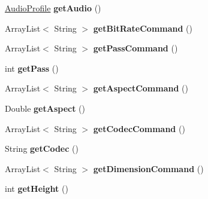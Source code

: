 \begin{DoxyCompactItemize}
\item 
\hypertarget{classvideo_1_1_video_profile_a46c05dc58b177b83356823f6cac11aaf}{
\hyperlink{classvideo_1_1_audio_profile}{AudioProfile} {\bfseries getAudio} ()}
\label{classvideo_1_1_video_profile_a46c05dc58b177b83356823f6cac11aaf}

\item 
\hypertarget{classvideo_1_1_video_profile_a53754b5c05e875826f8929217d2b11c7}{
ArrayList$<$ String $>$ {\bfseries getBitRateCommand} ()}
\label{classvideo_1_1_video_profile_a53754b5c05e875826f8929217d2b11c7}

\item 
\hypertarget{classvideo_1_1_video_profile_aa2683fb200af906a6328a219bb2ae248}{
ArrayList$<$ String $>$ {\bfseries getPassCommand} ()}
\label{classvideo_1_1_video_profile_aa2683fb200af906a6328a219bb2ae248}

\item 
\hypertarget{classvideo_1_1_video_profile_ac0ccef7d4ceece3106374cd1bacbca0f}{
int {\bfseries getPass} ()}
\label{classvideo_1_1_video_profile_ac0ccef7d4ceece3106374cd1bacbca0f}

\item 
\hypertarget{classvideo_1_1_video_profile_a94541cda8a04be32e8a5ade88fefce86}{
ArrayList$<$ String $>$ {\bfseries getAspectCommand} ()}
\label{classvideo_1_1_video_profile_a94541cda8a04be32e8a5ade88fefce86}

\item 
\hypertarget{classvideo_1_1_video_profile_ae97a3876b5b3e58615f8519d97349ee8}{
Double {\bfseries getAspect} ()}
\label{classvideo_1_1_video_profile_ae97a3876b5b3e58615f8519d97349ee8}

\item 
\hypertarget{classvideo_1_1_video_profile_af8fe2807d7c04a9afbe3cdd4932c46d0}{
ArrayList$<$ String $>$ {\bfseries getCodecCommand} ()}
\label{classvideo_1_1_video_profile_af8fe2807d7c04a9afbe3cdd4932c46d0}

\item 
\hypertarget{classvideo_1_1_video_profile_a7c79a0d46880abb1b011fff4cd8b5b88}{
String {\bfseries getCodec} ()}
\label{classvideo_1_1_video_profile_a7c79a0d46880abb1b011fff4cd8b5b88}

\item 
\hypertarget{classvideo_1_1_video_profile_a05df9200386550ecd0cdd9beb2c4ccd3}{
ArrayList$<$ String $>$ {\bfseries getDimensionCommand} ()}
\label{classvideo_1_1_video_profile_a05df9200386550ecd0cdd9beb2c4ccd3}

\item 
\hypertarget{classvideo_1_1_video_profile_a84dd5a89a5d11b8f8b302dbdbd07027b}{
int {\bfseries getHeight} ()}
\label{classvideo_1_1_video_profile_a84dd5a89a5d11b8f8b302dbdbd07027b}


\end{DoxyCompactItemize}
